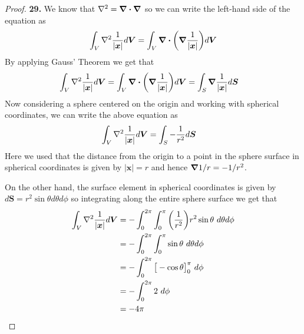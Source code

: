 \documentclass[11pt]{article}
\theoremstyle{definition}
\begin{document}
\begin{proof}{\textbf{29.}}
    We know that $\laplacian = \div\gradient$ so we can write
    the left-hand side of the equation as
    \begin{align*}
        \int_V \laplacian\frac{1}{|\bm{x}|} d\bm V
        =\int_V \div(\gradient \frac{1}{|\bm{x}|}) d\bm V
    \end{align*}
    By applying Gauss' Theorem we get that
    \begin{align*}
        \int_V \laplacian\frac{1}{|\bm{x}|} d\bm V 
        = \int_V \div(\gradient \frac{1}{|\bm{x}|}) d\bm V
        &= \int_S \gradient \frac{1}{|\bm{x}|} d\bm S
    \end{align*}
    Now considering a sphere centered on the origin and working
    with spherical coordinates, we can write the above equation as
    \begin{align*}
        \int_V \laplacian\frac{1}{|\bm{x}|} d\bm V
        &= \int_S -\frac{1}{r^2} d\bm S
    \end{align*}
    Here we used that the distance from the origin to a point in
    the sphere surface in spherical coordinates is given by $|\bm{x}| = r$
    and hence $\gradient 1/r = -1/r^2$.

    On the other hand, the surface element in spherical coordinates is
    given by $d\bm{S} = r^2 \sin\theta d\theta d\phi$ so integrating along the
    entire sphere surface we get that
    \begin{align*}
        \int_V \laplacian\frac{1}{|\bm{x}|} d\bm V
        &= -\int_0^{2\pi}\int_0^\pi \bigg(\frac{1}{r^2}\bigg)
        r^2 \sin\theta~d\theta d\phi\\
        &= -\int_0^{2\pi}\int_0^\pi \sin\theta~d\theta d\phi\\
        &= -\int_0^{2\pi} \big[-\cos\theta\big]_0^\pi~d\phi\\
        &= -\int_0^{2\pi} 2~d\phi\\
        &= -4\pi
    \end{align*}
\end{proof}
\cleardoublepage
\end{document}
